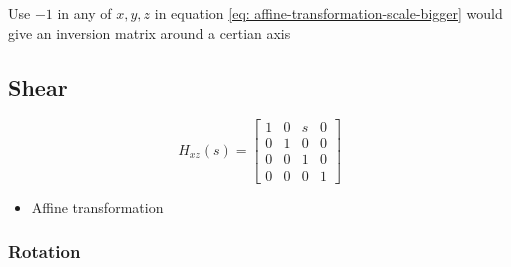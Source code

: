   Use $ -1 $ in any of $ x, y, z $ in equation
  \ref{eq: affine-transformation-scale-bigger} would give an inversion matrix
  around a certian axis

\subsection{Shear}

  \begin{equation}
    H_{xz}\left( s \right) =
    \begin{bmatrix}
      1 & 0 & s & 0 \\
      0 & 1 & 0 & 0 \\
      0 & 0 & 1 & 0 \\
      0 & 0 & 0 & 1
    \end{bmatrix}
  \end{equation}

  \begin{itemize}
    \item Affine transformation
  \end{itemize}

\subsubsection{Rotation}


